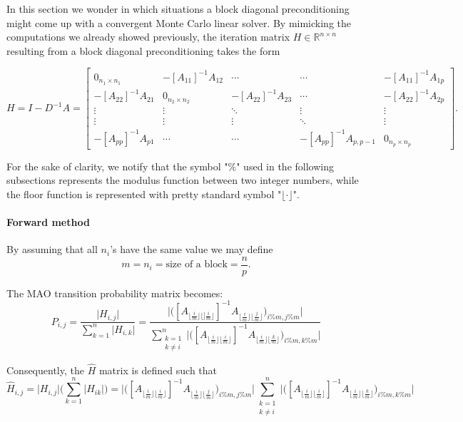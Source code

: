  In this section we wonder in which situations a block diagonal preconditioning
might come up with a convergent Monte Carlo linear solver.
By mimicking the computations we already showed previously, the iteration
matrix $H\in\mathbb{R}^{n\times n}$ resulting from a block diagonal
preconditioning takes the form

\[
 H=I-D^{-1}A=\begin{bmatrix}0_{n_1\times n_1} & -[A_{11}]^{-1}A_{12} & \cdots &
\cdots & -[A_{11}]^{-1}A_{1p} \\
-[A_{22}]^{-1}A_{21} & 0_{n_2\times n_2} & -[A_{22}]^{-1}A_{23} &
\cdots & -[A_{22}]^{-1}A_{2p}\\
\vdots & \vdots & \ddots & \vdots & \vdots\\
\vdots & \vdots & \vdots &\ddots & \vdots \\
-[A_{pp}]^{-1}A_{p1} &  \cdots & \cdots&
-[A_{pp}]^{-1}A_{p,p-1} & 0_{n_p \times n_p}
\end{bmatrix}.
\]

For the sake of clarity, we notify that the symbol "$\%$" used in the following
subsections represents the modulus function between two integer numbers, while
the floor function is represented with pretty standard symbol "$\lfloor
\cdot \rfloor$".

\paragraph{Forward method}
By assuming that all $n_i$'s have the same value we may define
\[
 m=n_i=\text{size of a block}=\frac{n}{p}.
\]

The MAO transition probability matrix becomes:
\[
 P_{i,j}=\frac{\lvert H_{i,j} \rvert}{\sum_{k=1}^n\lvert H_{i,k}
\rvert}=\frac{\bigg \lvert \bigg ([A_{\lfloor
\frac{i}{m}\rfloor \lfloor]
\frac{i}{m}\rfloor}]^{-1} A_{\lfloor \frac{i}{m}\rfloor \lfloor
\frac{j}{m}\rfloor}\bigg )_{i\%m,j\%m}\bigg
\rvert}{\sum_{\substack{k=1\\k\ne i}}^n\bigg \lvert \bigg
([A_{\lfloor
\frac{i}{m}\rfloor \lfloor
\frac{i}{m}\rfloor}]^{-1} A_{\lfloor \frac{i}{m}\rfloor \lfloor
\frac{k}{m}\rfloor}\bigg )_{i\%m,k\%m}\bigg \rvert}
\]

Consequently, the $\hat{H}$ matrix is defined such that
\[
\hat{H}_{i,j} = \lvert H_{i,j}\rvert\bigg(\sum_{k=1}^n\lvert H_{ik}\rvert\bigg)=
\bigg \lvert \bigg ([A_{\lfloor \frac{i}{m}\rfloor \lfloor
\frac{i}{m}\rfloor}]^{-1} A_{\lfloor \frac{i}{m}\rfloor \lfloor
\frac{j}{m}\rfloor}\bigg )_{i\%m,j\%m}\bigg
\rvert
\sum_{\substack{k=1\\k\ne i}}^n\bigg \lvert \bigg ([A_{\lfloor
\frac{i}{m}\rfloor \lfloor
\frac{i}{m}\rfloor}]^{-1} A_{\lfloor \frac{i}{m}\rfloor \lfloor
\frac{k}{m}\rfloor}\bigg )_{i\%m,k\%m}\bigg \rvert
\]

